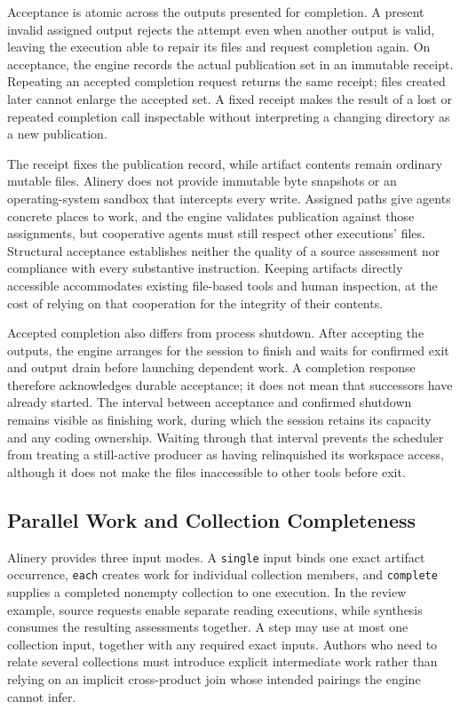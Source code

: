 \documentclass[letterpaper]{article}
\theoremstyle{definition}
\begin{document}
Acceptance is atomic across the outputs presented for completion. A present
invalid assigned output rejects the attempt even when another output is
valid, leaving the execution able to repair its files and request completion
again. On acceptance, the engine records the actual publication set in an
immutable receipt. Repeating an accepted completion request returns the same
receipt; files created later cannot enlarge the accepted set. A fixed
receipt makes the result of a lost or repeated completion call inspectable
without interpreting a changing directory as a new publication.

The receipt fixes the publication record, while artifact contents remain
ordinary mutable files. Alinery does not provide immutable byte snapshots
or an operating-system sandbox that intercepts every write. Assigned paths
give agents concrete places to work, and the engine validates publication
against those assignments, but cooperative agents must still respect other
executions' files. Structural acceptance establishes neither the quality of
a source assessment nor compliance with every substantive instruction.
Keeping artifacts directly accessible accommodates existing file-based
tools and human inspection, at the cost of relying on that cooperation for
the integrity of their contents.

Accepted completion also differs from process shutdown. After accepting the
outputs, the engine arranges for the session to finish and waits for
confirmed exit and output drain before launching dependent work. A
completion response therefore acknowledges durable acceptance; it does not
mean that successors have already started. The interval between acceptance
and confirmed shutdown remains visible as finishing work, during which the
session retains its capacity and any coding ownership. Waiting through that
interval prevents the scheduler from treating a still-active producer as
having relinquished its workspace access, although it does not make the
files inaccessible to other tools before exit.

\subsection{Parallel Work and Collection Completeness}

Alinery provides three input modes. A \texttt{single} input binds one exact
artifact occurrence, \texttt{each} creates work for individual collection
members, and \texttt{complete} supplies a completed nonempty collection to
one execution. In the review example, source requests enable separate
reading executions, while synthesis consumes the resulting assessments
together. A step may use at most one collection input, together with any
required exact inputs. Authors who need to relate several collections must
introduce explicit intermediate work rather than relying on an implicit
cross-product join whose intended pairings the engine cannot infer.
\end{document}

